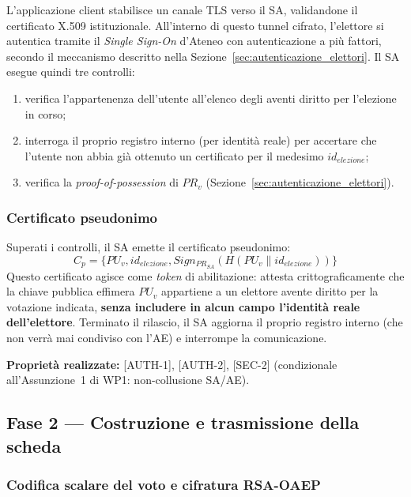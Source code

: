 L'applicazione client stabilisce un canale TLS verso il SA, validandone il certificato X.509 istituzionale. All'interno di questo tunnel cifrato, l'elettore si autentica tramite il \textit{Single Sign-On} d'Ateneo con autenticazione a più fattori, secondo il meccanismo descritto nella Sezione~\ref{sec:autenticazione_elettori}. Il SA esegue quindi tre controlli:
\begin{enumerate}
    \item verifica l'appartenenza dell'utente all'elenco degli aventi diritto per l'elezione in corso;
    \item interroga il proprio registro interno (per identità reale) per accertare che l'utente non abbia già ottenuto un certificato per il medesimo $id_{elezione}$;
    \item verifica la \textit{proof-of-possession} di $PR_v$ (Sezione~\ref{sec:autenticazione_elettori}).
\end{enumerate}

\subsubsection{Certificato pseudonimo}
\label{subsubsec:wp2_certificato_pseudonimo}

Superati i controlli, il SA emette il certificato pseudonimo:
$$C_p = \{ PU_v, id_{elezione}, Sign_{PR_{SA}}(H(PU_v \parallel id_{elezione})) \}$$
Questo certificato agisce come \textit{token} di abilitazione: attesta crittograficamente che la chiave pubblica effimera $PU_v$ appartiene a un elettore avente diritto per la votazione indicata, \textbf{senza includere in alcun campo l'identità reale dell'elettore}. Terminato il rilascio, il SA aggiorna il proprio registro interno (che non verrà mai condiviso con l'AE) e interrompe la comunicazione.

\textbf{Proprietà realizzate:} [AUTH-1], [AUTH-2], [SEC-2] (condizionale all'Assunzione~1 di WP1: non-collusione SA/AE).

\subsection{Fase 2 --- Costruzione e trasmissione della scheda}
\label{subsec:wp2_fase_costruzione_scheda}

\subsubsection{Codifica scalare del voto e cifratura RSA-OAEP}
\label{subsubsec:wp2_codifica_voto}

